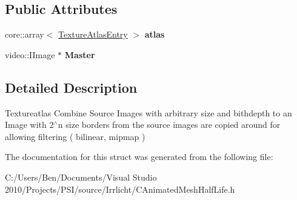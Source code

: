 \subsection*{Public Attributes}
\begin{DoxyCompactItemize}
\item 
\hypertarget{structirr_1_1scene_1_1_s_texture_atlas_aa9bce168734e52ae68b76cae7852e812}{core\-::array$<$ \hyperlink{structirr_1_1scene_1_1_s_texture_atlas_1_1_texture_atlas_entry}{Texture\-Atlas\-Entry} $>$ {\bfseries atlas}}\label{structirr_1_1scene_1_1_s_texture_atlas_aa9bce168734e52ae68b76cae7852e812}

\item 
\hypertarget{structirr_1_1scene_1_1_s_texture_atlas_a2d3562cd2529ea73b9d080e35aee9e30}{video\-::\-I\-Image $\ast$ {\bfseries Master}}\label{structirr_1_1scene_1_1_s_texture_atlas_a2d3562cd2529ea73b9d080e35aee9e30}

\end{DoxyCompactItemize}


\subsection{Detailed Description}
Textureatlas Combine Source Images with arbitrary size and bithdepth to an Image with 2$^\wedge$n size borders from the source images are copied around for allowing filtering ( bilinear, mipmap ) 

The documentation for this struct was generated from the following file\-:\begin{DoxyCompactItemize}
\item 
C\-:/\-Users/\-Ben/\-Documents/\-Visual Studio 2010/\-Projects/\-P\-S\-I/source/\-Irrlicht/C\-Animated\-Mesh\-Half\-Life.\-h\end{DoxyCompactItemize}
